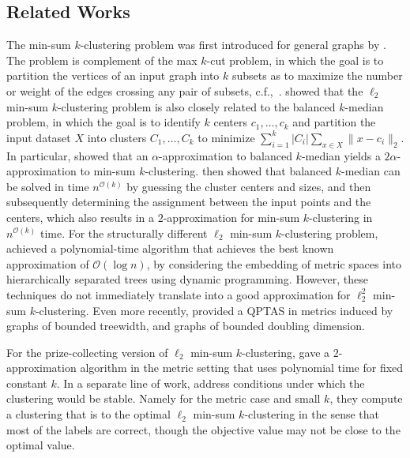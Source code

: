 \documentclass[10pt,a4paper]{amsart}
\newcommand{\seclab}[1]{\label{sec:#1}}
\renewcommand{\O}[1]{\ensuremath{\mathcal{O}\left(#1\right)}}
\begin{document}
\subsection{Related Works}
\seclab{sec:related}
The min-sum $k$-clustering problem was first introduced for general graphs by \cite{SahniG76}. 
The problem is complement of the max $k$-cut problem, in which the goal is to partition the vertices of an input graph into $k$ subsets as to maximize the number or weight of the edges crossing any pair of subsets, c.f.,~\cite{PapadimitriouY91}.  
\cite{Guttmann-BeckH98a} showed that the $\ell_2$ min-sum $k$-clustering problem is also closely related to the balanced $k$-median problem, in which the goal is to identify $k$ centers $c_1,\ldots,c_k$ and partition the input dataset $X$ into clusters $C_1,\ldots,C_k$ to minimize $\sum_{i=1}^k|C_i|\sum_{x\in X}\|x-c_i\|_2$.%
In particular, \cite{Guttmann-BeckH98a} showed that an $\alpha$-approximation to balanced $k$-median yields a $2\alpha$-approximation to min-sum $k$-clustering. 
\cite{Guttmann-BeckH98a} then showed that balanced $k$-median can be solved in time $n^{\O{k}}$ by guessing the cluster centers and sizes, and then subsequently determining the assignment between the input points and the centers, which also results in a $2$-approximation for min-sum $k$-clustering in $n^{\O{k}}$ time. 
For the structurally different $\ell_2$ min-sum $k$-clustering problem, \cite{BehsazFSS19} achieved a polynomial-time algorithm that achieves the best known approximation of $\O{\log n}$, by considering the embedding of metric spaces into hierarchically separated trees using dynamic programming. 
However, these techniques do not immediately translate into a good approximation for $\ell_2^2$ min-sum $k$-clustering. 
Even more recently, \cite{naderi2024approximation} provided a QPTAS in metrics induced by graphs of bounded treewidth, and graphs of bounded doubling dimension.

For the prize-collecting version of $\ell_2$ min-sum $k$-clustering, \cite{HassinO10} gave a $2$-approximation algorithm in the metric setting that uses polynomial time for fixed constant $k$. 
In a separate line of work, \cite{BalcanB09,BalcanBG09} address conditions under which the clustering would be stable. 
Namely for the metric case and small $k$, they compute a clustering that is to the optimal $\ell_2$ min-sum $k$-clustering in the sense that most of the labels are correct, though the objective value may not be close to the optimal value. 
\end{document}
